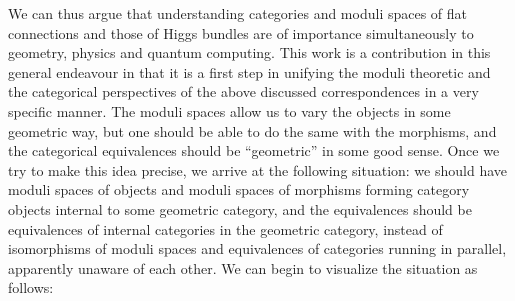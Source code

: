 \documentclass[11pt]{amsart}
\begin{document}
We can thus argue that
understanding categories and moduli spaces of flat connections and those of
Higgs bundles are of importance simultaneously to geometry, physics and
quantum computing. This work is a contribution in this general endeavour in
that it is a first step in unifying the moduli theoretic and the
categorical perspectives of the above discussed correspondences in a very
specific manner.
The moduli spaces allow us to vary the objects in some geometric way, but one
should be able to do the same with the morphisms, and the categorical
equivalences should be ``geometric'' in some good sense. Once we try to make
this idea precise, we arrive at the following situation:
we should have moduli spaces of objects and moduli spaces of morphisms
forming category objects internal to some geometric category, and the
equivalences should be equivalences of internal categories in the geometric
category, instead of isomorphisms of moduli spaces and equivalences of
categories running in parallel, apparently unaware of each other.
We can begin to visualize the situation as follows:
\end{document}
